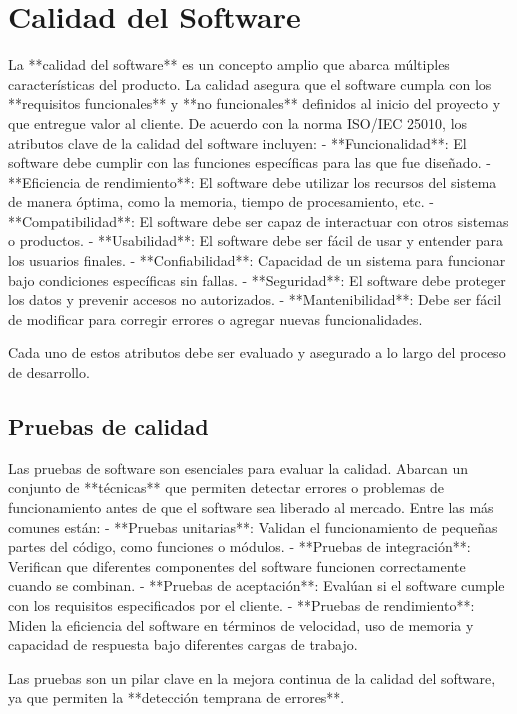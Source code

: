 \documentclass[12pt]{article}
\begin{document}
\section{Calidad del Software}
La **calidad del software** es un concepto amplio que abarca múltiples características del producto. La calidad asegura que el software cumpla con los **requisitos funcionales** y **no funcionales** definidos al inicio del proyecto y que entregue valor al cliente. De acuerdo con la norma ISO/IEC 25010, los atributos clave de la calidad del software incluyen:
- **Funcionalidad**: El software debe cumplir con las funciones específicas para las que fue diseñado.
- **Eficiencia de rendimiento**: El software debe utilizar los recursos del sistema de manera óptima, como la memoria, tiempo de procesamiento, etc.
- **Compatibilidad**: El software debe ser capaz de interactuar con otros sistemas o productos.
- **Usabilidad**: El software debe ser fácil de usar y entender para los usuarios finales.
- **Confiabilidad**: Capacidad de un sistema para funcionar bajo condiciones específicas sin fallas.
- **Seguridad**: El software debe proteger los datos y prevenir accesos no autorizados.
- **Mantenibilidad**: Debe ser fácil de modificar para corregir errores o agregar nuevas funcionalidades.

Cada uno de estos atributos debe ser evaluado y asegurado a lo largo del proceso de desarrollo.

\subsection{Pruebas de calidad}
Las pruebas de software son esenciales para evaluar la calidad. Abarcan un conjunto de **técnicas** que permiten detectar errores o problemas de funcionamiento antes de que el software sea liberado al mercado. Entre las más comunes están:
- **Pruebas unitarias**: Validan el funcionamiento de pequeñas partes del código, como funciones o módulos.
- **Pruebas de integración**: Verifican que diferentes componentes del software funcionen correctamente cuando se combinan.
- **Pruebas de aceptación**: Evalúan si el software cumple con los requisitos especificados por el cliente.
- **Pruebas de rendimiento**: Miden la eficiencia del software en términos de velocidad, uso de memoria y capacidad de respuesta bajo diferentes cargas de trabajo.

Las pruebas son un pilar clave en la mejora continua de la calidad del software, ya que permiten la **detección temprana de errores**.
\end{document}

